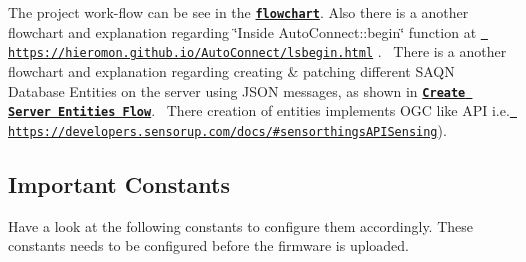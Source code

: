 The project work-\/flow can be see in the \href{StatemachineFlow.pdf}{\texttt{ {\bfseries{flowchart}}}}. Also there is a another flowchart and explanation regarding \char`\"{}\+Inside Auto\+Connect\+::begin\char`\"{} function at \href{https://hieromon.github.io/AutoConnect/lsbegin.html}{\texttt{ https\+://hieromon.\+github.\+io/\+Auto\+Connect/lsbegin.\+html}} .~\newline
 There is a another flowchart and explanation regarding creating \& patching different S\+A\+QN Database Entities on the server using J\+S\+ON messages, as shown in \href{CreateEntitiesFlow.pdf}{\texttt{ {\bfseries{Create Server Entities Flow}}}}.~\newline
 There creation of entities implements O\+GC like A\+PI i.\+e. \href{https://developers.sensorup.com/docs/\#sensorthingsAPISensing}{\texttt{ https\+://developers.\+sensorup.\+com/docs/\#sensorthings\+A\+P\+I\+Sensing}}).~\newline
\hypertarget{index_const}{}\subsection{Important Constants}\label{index_const}
Have a look at the following constants to configure them accordingly. These constants needs to be configured before the firmware is uploaded.
